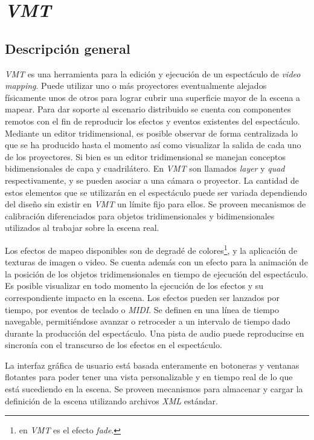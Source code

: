 \chapter{\emph{VMT}}
\section{Descripción general}%
\emph{VMT} es una herramienta para la edición y ejecución de un espectáculo de \emph{video mapping}. Puede utilizar uno o más proyectores eventualmente alejados físicamente unos de otros para lograr cubrir una superficie mayor de la escena a mapear. Para dar soporte al escenario distribuido se cuenta con componentes remotos con el fin de reproducir los efectos y eventos existentes del espectáculo. Mediante un editor tridimensional, es posible observar de forma centralizada lo que se ha producido hasta el momento así como visualizar la salida de cada uno de los proyectores. Si bien es un editor tridimensional se manejan conceptos bidimensionales de capa y cuadrilátero. En \emph{VMT} son llamados \emph{layer} y \emph{quad} respectivamente, y se pueden asociar a una cámara o proyector. La cantidad de estos elementos que se utilizarán en el espectáculo puede ser variada dependiendo del diseño sin existir en \emph{VMT} un límite fijo para ellos. Se proveen mecanismos de calibración diferenciados para objetos tridimensionales y bidimensionales utilizados al trabajar sobre la escena real.

Los efectos de mapeo disponibles son de degradé de colores\footnote{en \emph{VMT} es el efecto \emph{fade}.}, y la aplicación de texturas de imagen o video. Se cuenta además con un efecto para la animación de la posición de los objetos tridimensionales en tiempo de ejecución del espectáculo. Es posible visualizar en todo momento la ejecución de los efectos y su correspondiente impacto en la escena. Los efectos pueden ser lanzados por tiempo, por eventos de teclado o \emph{MIDI}. Se definen en una línea de tiempo navegable, permitiéndose avanzar o retroceder a un intervalo de tiempo dado durante la producción del espectáculo. Una pista de audio puede reproducirse en sincronía con el transcurso de los efectos en el espectáculo.

La interfaz gráfica de usuario está basada enteramente en botoneras y ventanas flotantes para poder tener una vista personalizable y en tiempo real de lo que está sucediendo en la escena. Se proveen mecanismos para almacenar y cargar la definición de la escena utilizando archivos \emph{XML} estándar.

